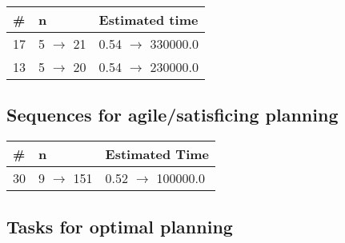 \documentclass{article}
\begin{document}
                            \begin{center}
                            \begin{tabular}{@{}l|l|l@{}}
                            \# & n & Estimated time\\\midrule
                            17&5 $\rightarrow$ 21&0.54 $\rightarrow$ 330000.0\\
13&5 $\rightarrow$ 20&0.54 $\rightarrow$ 230000.0
                            \end{tabular}
                            \end{center}
                    
                         \subsection*{Sequences for agile/satisficing planning}

                        \begin{center}
                        \begin{tabular}{@{}l|l|l@{}}
                        \# & n & Estimated Time\\\midrule
                        30&9 $\rightarrow$ 151&0.52 $\rightarrow$ 100000.0
                        \end{tabular}
                        \end{center}
                    
                                \subsection*{Tasks for optimal planning}
                                
\end{document}
